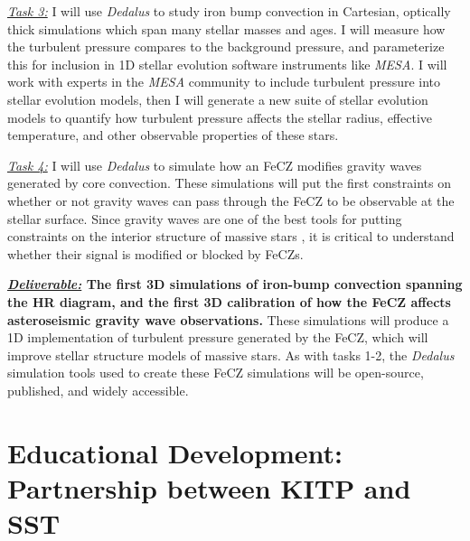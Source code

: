 \documentclass[11pt]{amsart} %
\theoremstyle{definition}
\numberwithin{equation}{section}
\begin{document}
\emph{\underline{Task 3:}} I will use \emph{Dedalus} to study iron bump convection in Cartesian, optically thick simulations which span many stellar masses and ages.
I will measure how the turbulent pressure compares to the background pressure, and parameterize this for inclusion in 1D stellar evolution software instruments like \emph{MESA}.
I will work with experts in the \emph{MESA} community to include turbulent pressure into stellar evolution models, then I will generate a new suite of stellar evolution models to quantify how turbulent pressure affects the stellar radius, effective temperature, and other observable properties of these stars.

\emph{\underline{Task 4:}} I will use \emph{Dedalus} to simulate how an FeCZ modifies gravity waves generated by core convection.
These simulations will put the first constraints on whether or not gravity waves can pass through the FeCZ to be observable at the stellar surface.
Since gravity waves are one of the best tools for putting constraints on the interior structure of massive stars \citep{aerts2010}, it is critical to understand whether their signal is modified or blocked by FeCZs.

\textbf{\underline{\emph{Deliverable:}} The first 3D simulations of iron-bump convection spanning the HR diagram, and the first 3D calibration of how the FeCZ affects asteroseismic gravity wave observations.}
These simulations will produce a 1D implementation of turbulent pressure generated by the FeCZ, which will improve stellar structure models of massive stars.
As with tasks 1-2, the \emph{Dedalus} simulation tools used to create these FeCZ simulations will be open-source, published, and widely accessible.

\section{Educational Development: Partnership between KITP and SST}
\end{document}
